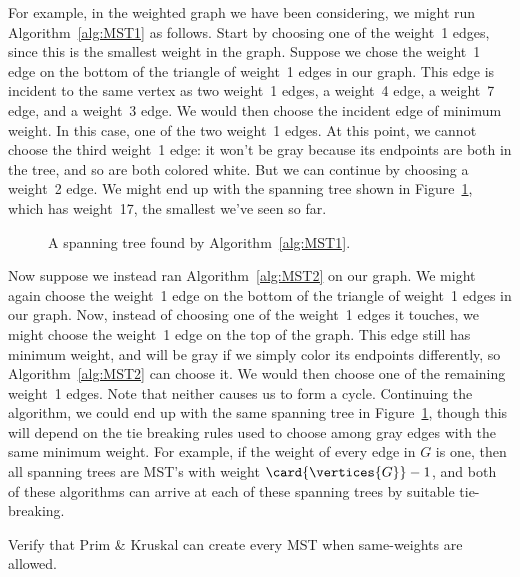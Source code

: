 \begin{editingnotes}
For example, in the weighted graph we have been considering, we might
run Algorithm~\ref{alg:MST1} as follows.  Start by choosing one of the
weight~1 edges, since this is the smallest weight in the graph.
Suppose we chose the weight~1 edge on the bottom of the triangle of
weight~1 edges in our graph.  This edge is incident to the same vertex
as two weight~1 edges, a weight~4 edge, a weight~7 edge, and a
weight~3 edge.  We would then choose the incident edge of minimum
weight.  In this case, one of the two weight~1 edges.  At this point,
we cannot choose the third weight~1 edge: it won't be gray because its
endpoints are both in the tree, and so are both colored white.  But we
can continue by choosing a weight~2 edge.  We might end up with the
spanning tree shown in Figure~\ref{fig:5KC}, which has weight~17, the
smallest we've seen so far.

\begin{figure}
\caption{A spanning tree found by Algorithm~\ref{alg:MST1}.}
\label{fig:5KC}
\end{figure}

Now suppose we instead ran Algorithm~\ref{alg:MST2} on our graph.  We
might again choose the weight~1 edge on the bottom of the triangle of
weight~1 edges in our graph.  Now, instead of choosing one of the
weight~1 edges it touches, we might choose the weight~1 edge on the
top of the graph.  This edge still has minimum weight, and will be
gray if we simply color its endpoints differently, so
Algorithm~\ref{alg:MST2} can choose it.  We would then choose one of
the remaining weight~1 edges.  Note that neither causes us to form a
cycle.  Continuing the algorithm, we could end up with the same
spanning tree in Figure~\ref{fig:5KC}, though this will depend on
the tie breaking rules used to choose among gray edges with the same
minimum weight.  For example, if the weight of every edge in $G$ is
one, then all spanning trees are MST's with weight
$\card{\vertices{G}}-1$, and both of these algorithms can arrive at
each of these spanning trees by suitable tie-breaking.
\end{editingnotes}

\begin{editingnotes}
Verify that Prim \& Kruskal can create every MST when same-weights are allowed.
\end{editingnotes}

